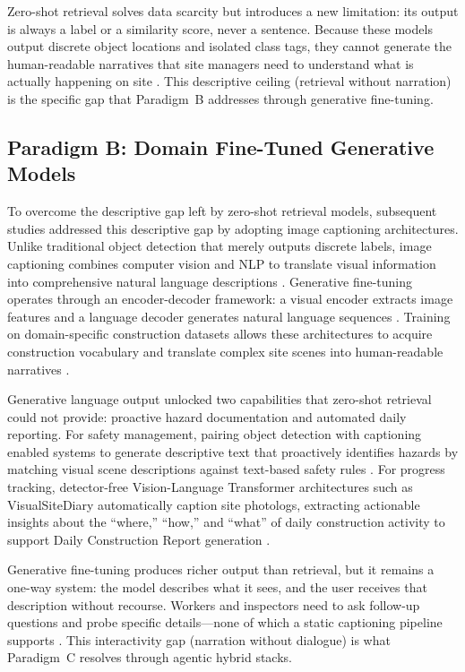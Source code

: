 \documentclass[10pt,letterpaper]{article}
\begin{document}
Zero-shot retrieval solves data scarcity but introduces a new limitation: its output is always a label or a similarity score, never a sentence. Because these models output discrete object locations and isolated class tags, they cannot generate the human-readable narratives that site managers need to understand what is actually happening on site \cite{bui2026}. This descriptive ceiling (retrieval without narration) is the specific gap that Paradigm~B addresses through generative fine-tuning.

\subsection{Paradigm B: Domain Fine-Tuned Generative Models}

To overcome the descriptive gap left by zero-shot retrieval models, subsequent studies addressed this descriptive gap by adopting image captioning architectures. Unlike traditional object detection that merely outputs discrete labels, image captioning combines computer vision and NLP to translate visual information into comprehensive natural language descriptions \cite{liu2020}. Generative fine-tuning operates through an encoder-decoder framework: a visual encoder extracts image features and a language decoder generates natural language sequences \cite{xiao2022}. Training on domain-specific construction datasets allows these architectures to acquire construction vocabulary and translate complex site scenes into human-readable narratives \cite{liu2020}.

Generative language output unlocked two capabilities that zero-shot retrieval could not provide: proactive hazard documentation and automated daily reporting. For safety management, pairing object detection with captioning enabled systems to generate descriptive text that proactively identifies hazards by matching visual scene descriptions against text-based safety rules \cite{wangxiao2024}. For progress tracking, detector-free Vision-Language Transformer architectures such as VisualSiteDiary automatically caption site photologs, extracting actionable insights about the ``where,'' ``how,'' and ``what'' of daily construction activity to support Daily Construction Report generation \cite{jung2024}.

Generative fine-tuning produces richer output than retrieval, but it remains a one-way system: the model describes what it sees, and the user receives that description without recourse. Workers and inspectors need to ask follow-up questions and probe specific details---none of which a static captioning pipeline supports \cite{chen2024}. This interactivity gap (narration without dialogue) is what Paradigm~C resolves through agentic hybrid stacks.
\end{document}
